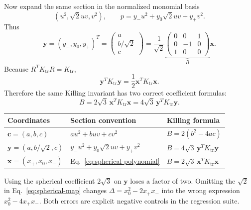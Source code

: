 \documentclass[11pt]{article}
\numberwithin{equation}{section}
\newcommand{\Ktr}{K_{\mathrm{tr}}}
\begin{document}
Now expand the same section in the normalized monomial basis
\begin{equation}
 (u^2,\sqrt2uv,v^2),
 \qquad
 p=y_-u^2+y_0\sqrt2uv+y_+v^2.
 \label{eq:normalized-monomials}
\end{equation}
Thus
\begin{equation}
 \bm y=(y_-,y_0,y_+)^T
 =\begin{pmatrix}a\\b/\sqrt2\\c\end{pmatrix}
 =\frac1{\sqrt2}
 \underbrace{\begin{pmatrix}0&0&1\\0&-1&0\\1&0&0\end{pmatrix}}_{R}
 \bm x.
 \label{eq:y-from-x}
\end{equation}
Because \(R^T\Ktr R=\Ktr\),
\begin{equation}
 \bm y^T\Ktr\bm y=\frac12\bm x^T\Ktr\bm x.
 \label{eq:factor-two-basis}
\end{equation}
Therefore the same Killing invariant has two correct coefficient formulas:
\begin{equation}
 \boxed{
 B=2\sqrt3\,\bm x^T\Ktr\bm x
  =4\sqrt3\,\bm y^T\Ktr\bm y.}
 \label{eq:two-basis-master}
\end{equation}

\begin{center}
\begin{tabularx}{\textwidth}{@{}>{\raggedright\arraybackslash}p{}
                                 >{\raggedright\arraybackslash}X
                                 >{\raggedright\arraybackslash}p{}@{}}
\toprule
Coordinates & Section convention & Killing formula\\
\midrule
\(\bm c=(a,b,c)\) & \(au^2+buv+cv^2\) &
\(B=2(b^2-4ac)\)\\
\(\bm y=(a,b/\sqrt2,c)\) &
\(y_-u^2+y_0\sqrt2uv+y_+v^2\) &
\(B=4\sqrt3\,\bm y^T\Ktr\bm y\)\\
\(\bm x=(x_+,x_0,x_-)\) &
Eq.~\eqref{eq:spherical-polynomial} &
\(B=2\sqrt3\,\bm x^T\Ktr\bm x\)\\
\bottomrule
\end{tabularx}
\end{center}
Using the spherical coefficient \(2\sqrt3\) on \(\bm y\) loses a factor of
two.  Omitting the \(\sqrt2\) in Eq.~\eqref{eq:spherical-map} changes
\(\Delta=x_0^2-2x_+x_-\) into the wrong expression
\(x_0^2-4x_+x_-\).  Both errors are explicit negative controls in the
regression suite.
\end{document}
